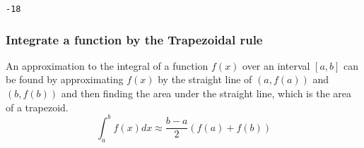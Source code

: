 \documentclass[11pt]{article}
\newcommand{\prompt}[4]{
        \llap{{\color{#2}[#3]: #4}}\vspace{-1.25em}
    }
\begin{document}
            \begin{tcolorbox}[breakable, boxrule=.5pt, size=fbox, pad at break*=1mm, opacityfill=0]
\prompt{Out}{outcolor}{1}{\hspace{3.5pt}}
\begin{Verbatim}[commandchars=\\\{\}]
-18
\end{Verbatim}
\end{tcolorbox}
        
    \subsubsection{Integrate a function by the Trapezoidal
rule}\label{integrate-a-function-by-the-trapezoidal-rule}

An approximation to the integral of a function \(f(x)\) over an interval
\([a, b]\) can be found by approximating \(f(x)\) by the straight line
of \((a, f(a))\) and \((b, f(b))\) and then finding the area under the
straight line, which is the area of a trapezoid.
\[\int_a^b f(x)dx \approx \frac{b-a}{2} (f(a)+f(b))\]
\end{document}
